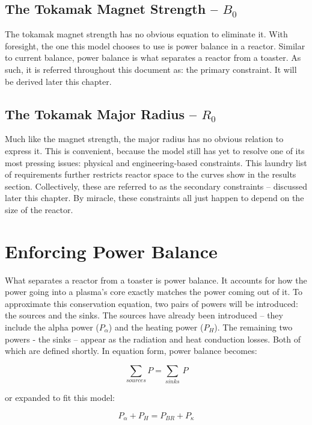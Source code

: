 \documentclass[11pt]{book}
\begin{document}
\subsection{The Tokamak Magnet Strength -- $B_0$}

The tokamak magnet strength has no obvious equation to eliminate it. With foresight, the one this model chooses to use is power balance in a reactor. Similar to current balance, power balance is what separates a reactor from a toaster. As such, it is referred throughout this document as: the primary constraint. It will be derived later this chapter.

\subsection{The Tokamak Major Radius -- $R_0$}

Much like the magnet strength, the major radius has no obvious relation to express it. This is convenient, because the model still has yet to resolve one of its most pressing issues: physical and engineering-based constraints. This laundry list of requirements further restricts reactor space to the curves show in the results section. Collectively, these are referred to as the secondary constraints -- discussed later this chapter. By miracle, these constraints all just happen to depend on the size of the reactor. 

\section{Enforcing Power Balance}

What separates a reactor from a toaster is power balance. It accounts for how the power going into a plasma's core exactly matches the power coming out of it. To approximate this conservation equation, two pairs of powers will be introduced: the sources and the sinks. The sources have already been introduced -- they include the alpha power ($P_\alpha$) and the heating power ($P_H$). The remaining two powers - the sinks -- appear as the radiation and heat conduction losses. Both of which are defined shortly. In equation form, power balance becomes:

\begin{equation}
	\sum_{sources} P = \sum_{sinks} \, P
\end{equation}

or expanded to fit this model:

\begin{equation}
	P_\alpha + P_H = P_{BR} + P_\kappa
\end{equation}
\end{document}
